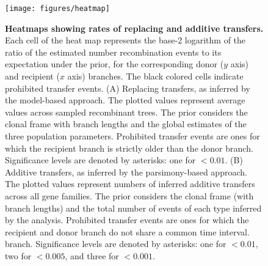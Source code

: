 \documentclass[12pt]{article}
\begin{document}


\begin{figure}
\texttt{[image: figures/heatmap]}
\caption{\label{fig:Heatmap-of-transfers}
{\bf Heatmaps showing rates of replacing and additive transfers.}
Each cell of the heat map represents the base-2 logarithm 
of the ratio of the estimated number recombination events to its expectation
under the prior, for the corresponding donor ($y$ axis) and recipient ($x$
axis) branches.  
The black colored cells indicate prohibited transfer events.
%
(A) Replacing transfers, as inferred by the model-based approach. The
plotted values represent 
average values across sampled recombinant
trees. The prior considers the clonal frame with branch lengths and the
global estimates of the three population parameters. Prohibited transfer events
are ones for which the recipient branch is strictly older than the donor
branch. Significance levels are denoted by asterisks: one for $<0.01$.
%
(B) Additive transfers, as inferred by the parsimony-based
approach. The plotted values represent
numbers of inferred additive transfers across all gene families.
The prior considers the clonal  frame (with branch lengths) and the total number
of events of each type inferred by the analysis. Prohibited transfer events are
ones for which the recipient and donor branch do not share a common time
interval.
branch. Significance levels are denoted by asterisks: one for $<0.01$, two for
$<0.005$, and three for $<0.001$.}
\end{figure}
\clearpage{}
\end{document}
